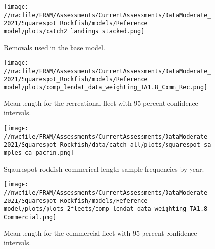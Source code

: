 \documentclass[11pt,
  english,
  a4paper,
]{article}
\begin{document}
\begin{figure}
\centering
\texttt{[image: //nwcfile/FRAM/Assessments/CurrentAssessments/DataModerate\_2021/Squarespot\_Rockfish/models/Reference model/plots/catch2 landings stacked.png]}
\caption{Removals used in the base model.\label{fig:catch}}
\end{figure}

\tagmcend\tagstructend


\begin{figure}
\centering
\texttt{[image: //nwcfile/FRAM/Assessments/CurrentAssessments/DataModerate\_2021/Squarespot\_Rockfish/models/Reference model/plots/comp\_lendat\_data\_weighting\_TA1.8\_Comm\_Rec.png]}
\caption{Mean length for the recreational fleet with 95 percent confidence intervals.\label{fig:rec-mean-len-data}}
\end{figure}

\tagmcend\tagstructend


\begin{figure}
\centering
\texttt{[image: //nwcfile/FRAM/Assessments/CurrentAssessments/DataModerate\_2021/Squarespot\_Rockfish/data/catch\_all/plots/squarespot\_samples\_ca\_pacfin.png]}
\caption{Sqaurespot rockfish commerical length sample frequencies by year.\label{fig:squarespot_samples_ca_pacfin}}
\end{figure}

\tagmcend\tagstructend


\begin{figure}
\centering
\texttt{[image: //nwcfile/FRAM/Assessments/CurrentAssessments/DataModerate\_2021/Squarespot\_Rockfish/models/Reference model/plots/plots\_2fleets/comp\_lendat\_data\_weighting\_TA1.8\_Commercial.png]}
\caption{Mean length for the commercial fleet with 95 percent confidence intervals.\label{fig:comm-mean-len-data}}
\end{figure}
\end{document}
